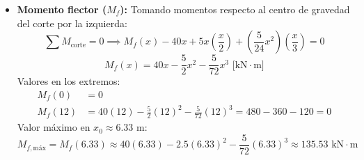 \begin{itemize}
    \item \textbf{Momento flector ($M_f$):}
          Tomando momentos respecto al centro de gravedad del corte por la izquierda:
          \begin{equation}
              \sum M_{\text{corte}} = 0 \implies M_f(x) - 40x + 5x\left(\frac{x}{2}\right) + \left(\frac{5}{24}x^2\right)\left(\frac{x}{3}\right) = 0
          \end{equation}
          \begin{equation}
              \boxed{M_f(x) = 40x - \frac{5}{2}x^2 - \frac{5}{72}x^3\text{ [kN}\cdot\text{m]}}
          \end{equation}
          Valores en los extremos:
          \begin{align*}
              M_f(0)  & = 0                                                                     \\
              M_f(12) & = 40(12) - \frac{5}{2}(12)^2 - \frac{5}{72}(12)^3 = 480 - 360 - 120 = 0
          \end{align*}
          Valor máximo en $x_0 \approx 6.33\text{ m}$:
          \begin{equation}
              M_{f,\text{máx}} = M_f(6.33) \approx 40(6.33) - 2.5(6.33)^2 - \frac{5}{72}(6.33)^3 \approx \boxed{135.53\text{ kN}\cdot\text{m}}
          \end{equation}
\end{itemize}

